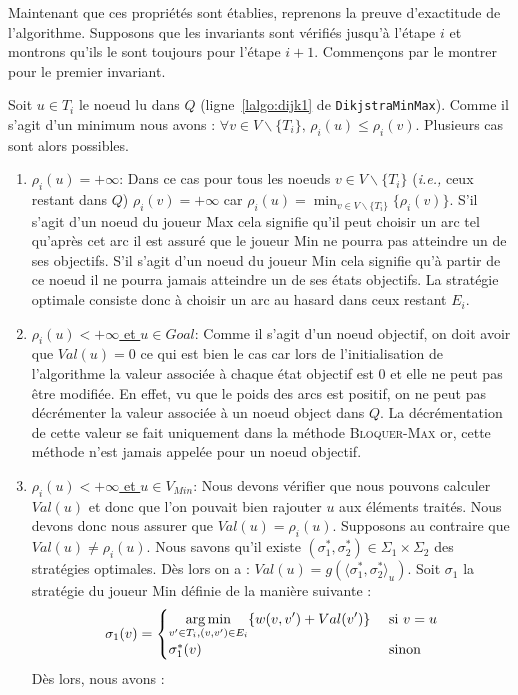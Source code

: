 Maintenant que ces propriétés sont établies, reprenons la preuve d'exactitude de l'algorithme. Supposons que les invariants sont vérifiés jusqu'à l'étape $i$ et montrons qu'ils le sont toujours pour l'étape $i+1$.
Commençons par le montrer pour le premier invariant.

Soit $u \in T_i$ le noeud lu dans $Q$ (ligne~\ref{lalgo:dijk1} de \verb|DikjstraMinMax|). Comme il s'agit d'un minimum nous avons : $\forall v \in V\backslash \{ T_i \},\, \rho_i(u) \leq \rho_i(v)$. Plusieurs cas sont alors possibles. 

\begin{enumerate}
	\item \underline{$\rho_i(u) = +\infty$}: Dans ce cas pour tous les noeuds $v \in V\backslash \{ T_i \}$ (\emph{i.e.,} ceux restant dans $Q$) $\rho_i(v) = + \infty$ car $\rho_i(u) = \min _{v \in V\backslash \{ T_i \}} \{\rho_i(v)\}$. S'il s'agit d'un noeud du joueur Max cela signifie qu'il peut choisir un arc tel qu'après cet arc il est assuré que le joueur Min ne pourra pas atteindre un de ses objectifs. S'il s'agit d'un noeud du joueur Min cela signifie qu'à partir de ce noeud il ne pourra jamais atteindre un de ses états objectifs. La stratégie optimale consiste donc à choisir un arc au hasard dans ceux restant $E_i$.
	\item\underline{$\rho_i(u) < +\infty$ et $u \in Goal$}: Comme il s'agit d'un noeud objectif, on doit avoir que $Val(u) = 0$ ce qui est bien le cas car lors de l'initialisation de l'algorithme la valeur associée à chaque état objectif est 0 et elle ne peut pas être modifiée. En effet, vu que le poids des arcs est positif, on ne peut pas décrémenter la valeur associée à un noeud object dans $Q$. La décrémentation de cette valeur se fait uniquement dans la méthode \textsc{Bloquer-Max} or, cette méthode n'est jamais appelée pour un noeud objectif.
	
	\item\underline{$\rho_i(u) < +\infty$ et $u \in V_{Min}$}: Nous devons vérifier que nous pouvons calculer $Val(u)$ et donc que l'on pouvait bien rajouter $u$ aux éléments traités. Nous devons donc nous assurer que $Val(u) = \rho_i(u)$.
	Supposons au contraire que $Val(u) \neq \rho_i(u)$. Nous savons qu'il existe $(\sigma_1^*,\sigma_2^*) \in \Sigma_1 \times \Sigma_2 $ des stratégies optimales. Dès lors on a : $Val(u) = g(\langle \sigma_1^*, \sigma_2^* \rangle_u)$. Soit $\sigma_1$ la stratégie du joueur Min définie de la manière suivante : $$  \sigma_1(v) = \begin{cases}
											\displaystyle	\operatorname*{arg\,min}_{v'\in T_i,(v,v')\in E_i} \{ w(v,v') + Val(v') \} & \text{ si } v = u\\
												\sigma_1^*(v) &\text{ sinon} \end{cases}$$
Dès lors, nous avons : 


\end{enumerate}
